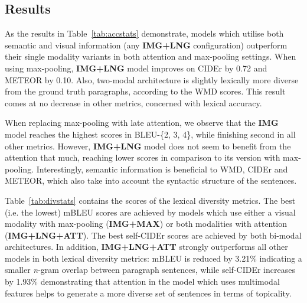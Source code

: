 \documentclass[11pt,a4paper]{article}
\begin{document}
\subsection{Results}

As the results in Table~\ref{tab:accstats} demonstrate, models which utilise both semantic and visual information (any \textbf{IMG+LNG} configuration) outperform their single modality variants in both attention and max-pooling settings.
When using max-pooling, \textbf{IMG+LNG} model improves on CIDEr by 0.72 and METEOR by 0.10.
Also, two-modal architecture is slightly lexically more diverse from the ground truth paragraphs, according to the WMD scores.
This result comes at no decrease in other metrics, concerned with lexical accuracy.

When replacing max-pooling with late attention, we observe that the \textbf{IMG} model reaches the highest scores in BLEU-\{2, 3, 4\}, while finishing second in all other metrics.
However, \textbf{IMG+LNG} model does not seem to benefit from the attention that much, reaching lower scores in comparison to its version with max-pooling.
Interestingly, semantic information is beneficial to WMD, CIDEr and METEOR, which also take into account the syntactic structure of the sentences.




Table~\ref{tab:divstats} contains the scores of the lexical diversity metrics. %
The best (i.e. the lowest) mBLEU scores are achieved by models which use either a visual modality with max-pooling (\textbf{IMG+MAX}) or both modalities with attention (\textbf{IMG+LNG+ATT}).
The best self-CIDEr scores are achieved by both bi-modal architectures.
In addition, \textbf{IMG+LNG+ATT} strongly outperforms all other models in both lexical diversity metrics: mBLEU is reduced by 3.21\% indicating a smaller \textit{n}-gram overlap between paragraph sentences, while self-CIDEr increases by 1.93\% demonstrating that attention in the model which uses multimodal features helps to generate a more diverse set of sentences in terms of topicality.
\end{document}
